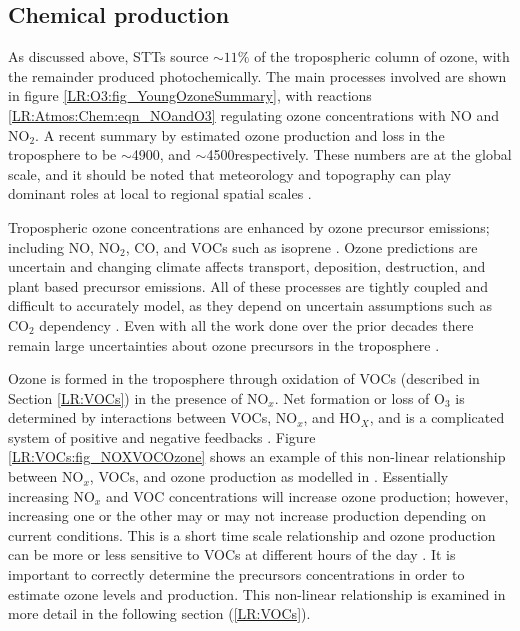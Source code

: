     
  \subsection{Chemical production}
    
    As discussed above, STTs source $\sim 11\%$ of the tropospheric column of ozone, with the remainder produced photochemically.
    The main processes involved are shown in figure \ref{LR:O3:fig_YoungOzoneSummary}, with reactions \ref{LR:Atmos:Chem:eqn_NOandO3} regulating ozone concentrations with NO and NO$_2$.
    A recent summary by \textcite{Young2018} estimated ozone production and loss in the troposphere to be $\sim$4900\tgpyr, and $\sim$4500\tgpyr respectively. 
    These numbers are at the global scale,  and it should be noted that meteorology and topography can play dominant roles at local to regional spatial scales \parencite[eg.][]{Kuang2017}.
    
    Tropospheric ozone concentrations are enhanced by ozone precursor emissions; including NO, NO$_2$, CO, and VOCs such as isoprene \parencite{Atkinson2000, Young2013, Marvin2017}.
    Ozone predictions are uncertain and changing climate affects transport, deposition, destruction, and plant based precursor emissions.
    All of these processes are tightly coupled and difficult to accurately model, as they depend on uncertain assumptions such as CO$_2$ dependency \parencite{Young2013}.
    Even with all the work done over the prior decades there remain large uncertainties about ozone precursors in the troposphere \parencite{Mazzuca2016}.
    
    
    Ozone is formed in the troposphere through oxidation of VOCs (described in Section \ref{LR:VOCs}) in the presence of NO$_x$.
    Net formation or loss of O$_3$ is determined by interactions between VOCs, NO$_x$, and HO$_X$, and is a complicated system of positive and negative feedbacks \parencite{Atkinson2000}.
    Figure \ref{LR:VOCs:fig_NOXVOCOzone} shows an example of this non-linear relationship between NO$_x$, VOCs, and ozone production as modelled in \textcite{Mazzuca2016}.
    Essentially increasing NO$_x$ and VOC concentrations will increase ozone production; however, increasing one or the other may or may not increase production depending on current conditions.
    This is a short time scale relationship and ozone production can be more or less sensitive to VOCs at different hours of the day \parencite{Mazzuca2016}.
    It is important to correctly determine the precursors concentrations in order to estimate ozone levels and production.
    This non-linear relationship is examined in more detail in the following section (\ref{LR:VOCs}).
    

